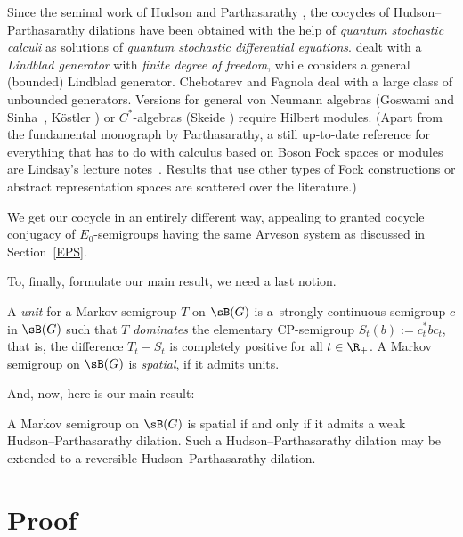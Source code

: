 \brem \label{HPhisrem}
Since the seminal work of Hudson and Parthasarathy \cite{HuPa84,HuPa84a}, the cocycles of Hudson--Parthasarathy dilations have been obtained with the help of {\it quantum stochastic calculi} as solutions of {\it quantum stochastic differential equations}. \cite{HuPa84} dealt with a {\it Lindblad generator} with {\it finite degree of freedom}, while \cite{HuPa84a} considers a general (bounded) Lindblad generator. Chebotarev and Fagnola \cite{CheFa98} deal with a large class of unbounded generators. Versions for general von Neumann algebras (Goswami and Sinha~\cite{GoSi99}, K\"ostler \cite{Koes00}) or $C^*$-algebras (Skeide \cite{Ske00}) require Hilbert modules. (Apart from the fundamental monograph \cite{Par92} by Parthasarathy, a still up-to-date reference for everything that has to do with calculus based on Boson Fock spaces or modules are Lindsay's lecture notes~\cite{Lin05}. Results that use other types of Fock constructions or abstract representation spaces are scattered over the literature.)

We get our cocycle in an entirely different way, appealing to granted cocycle conjugacy of $E_0$-semigroups having the same Arveson system as discussed in Section~\ref{EPS}.
\erem

To, finally, formulate our main result, we need a last notion.

A \emph{unit} for a Markov semigroup $T$ on $\sB(G)$ is a~strongly continuous semigroup $c$ in $\sB(G)$ such that $T$ \emph{dominates} the elementary CP-semigroup $S_t(b):=c_t^*bc_t$, that is, the difference $T_t-S_t$ is completely positive for all $t\in\R_+$. A Markov semigroup on $\sB(G)$ is \emph{spatial}, if it admits units.
\edefi

And, now, here is our main result:

\bthm \label{mthm}
A Markov semigroup on $\sB(G)$ is spatial if and only if it admits a weak Hudson--Partha\-sarathy dilation. Such a Hudson--Parthasarathy dilation may be extended to a reversible Hudson--Parthasarathy dilation.
\ethm

\section{Proof}\label{proofSEC}

